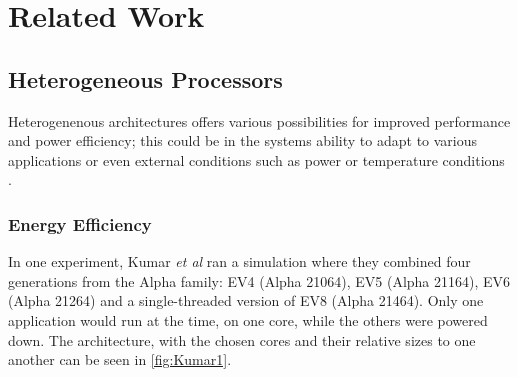\chapter{Related Work}
\label{cha:related-work}


\section{Heterogeneous Processors}

Heterogenenous architectures offers various possibilities for improved performance and power efficiency;
this could be in the systems ability to adapt to various applications or even external conditions such as
power or temperature conditions \cite{heterogeneous-ee, heterogeneous-perf, heterogeneous-arch}.


\subsection{Energy Efficiency}
\label{subsec:rw_ee} 
In one experiment, Kumar \textit{et al}\cite{heterogeneous-ee} ran a simulation where they combined four generations from the Alpha family: EV4 (Alpha 21064), EV5 (Alpha 21164), EV6 (Alpha 21264) and a single-threaded version of EV8 (Alpha 21464).
Only one application would run at the time, on one core, while the others were powered down.
The architecture, with the chosen cores and their relative sizes to one another can be seen in 
\ref{fig:Kumar1}.

